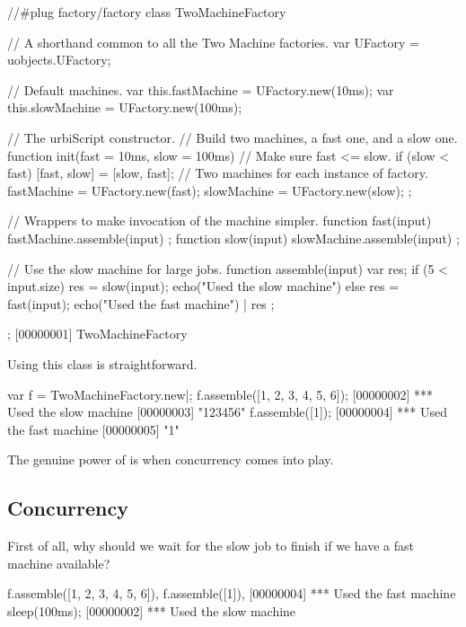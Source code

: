 \begin{urbiscript}
//#plug factory/factory
class TwoMachineFactory
{
  // A shorthand common to all the Two Machine factories.
  var UFactory = uobjects.UFactory;

  // Default machines.
  var this.fastMachine = UFactory.new(10ms);
  var this.slowMachine = UFactory.new(100ms);

  // The urbiScript constructor.
  // Build two machines, a fast one, and a slow one.
  function init(fast = 10ms, slow = 100ms)
  {
    // Make sure fast <= slow.
    if (slow < fast)
      [fast, slow] = [slow, fast];
    // Two machines for each instance of factory.
    fastMachine = UFactory.new(fast);
    slowMachine = UFactory.new(slow);
  };

  // Wrappers to make invocation of the machine simpler.
  function fast(input) { fastMachine.assemble(input) };
  function slow(input) { slowMachine.assemble(input) };

  // Use the slow machine for large jobs.
  function assemble(input)
  {
    var res;
    if (5 < input.size)
      { res = slow(input); echo("Used the slow machine") }
    else
      { res = fast(input); echo("Used the fast machine") } |
    res
  };
};
[00000001] TwoMachineFactory
\end{urbiscript}

Using this class is straightforward.

\begin{urbiscript}[firstnumber=last]
var f = TwoMachineFactory.new|;
f.assemble([1, 2, 3, 4, 5, 6]);
[00000002] *** Used the slow machine
[00000003] "123456"
f.assemble([1]);
[00000004] *** Used the fast machine
[00000005] "1"
\end{urbiscript}

The genuine power of \us is when concurrency comes into play.

\subsection{Concurrency}
%
%
%

First of all, why should we wait for the slow job to finish if we have
a fast machine available?

\begin{urbiscript}[firstnumber=last]
f.assemble([1, 2, 3, 4, 5, 6]),
f.assemble([1]),
[00000004] *** Used the fast machine
sleep(100ms);
[00000002] *** Used the slow machine
\end{urbiscript}


